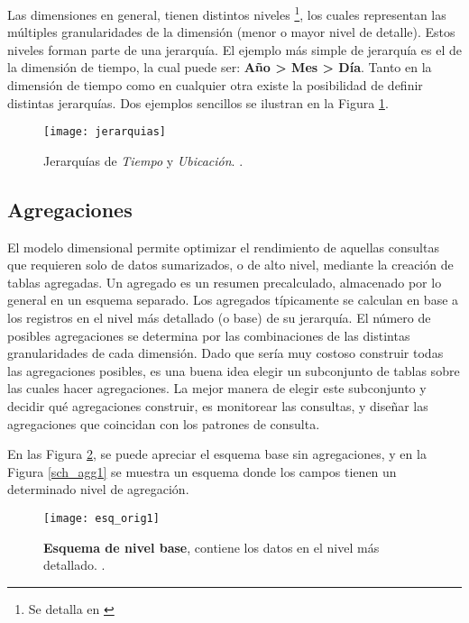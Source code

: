 \documentclass[a4paper,11pt]{article}
\begin{document}
    Las dimensiones en general, tienen distintos niveles \footnote{Se detalla en \cite[p.~94]{olap_solutions}}, los cuales representan las
    múltiples granularidades de la dimensión (menor o mayor nivel de detalle). Estos niveles forman parte de una jerarquía. El ejemplo más simple de
    jerarquía es el de la dimensión de tiempo, la cual puede ser: \textbf{Año > Mes > Día}. Tanto en la dimensión de
    tiempo como en cualquier otra existe la posibilidad de definir distintas jerarquías. Dos ejemplos sencillos se ilustran en la Figura
    \ref{jerarquías}.
    
    \begin{figure}
      \begin{center}
        \texttt{[image: jerarquias]}
        \caption{Jerarquías de \textit{Tiempo} y \textit{Ubicación}. \cite[p.~94]{olap_solutions}.}
        \label{jerarquías}
      \end{center}
    \end{figure}
    
    
    \subsection{Agregaciones} \label{agregaciones}
    
    El modelo dimensional permite optimizar el rendimiento de aquellas consultas que requieren solo de datos sumarizados, o de alto nivel,
    mediante la creación de tablas agregadas.
    Un agregado es un resumen precalculado, almacenado por lo general en un esquema separado. Los agregados típicamente se calculan en base
    a los registros en el nivel más detallado (o base) de su jerarquía.
    El número de posibles agregaciones se determina por las combinaciones de las distintas granularidades de cada dimensión.
    Dado que sería muy costoso construir todas las agregaciones  posibles, es una buena idea elegir un subconjunto de tablas sobre las cuales
    hacer agregaciones. La mejor manera de elegir este subconjunto y decidir qué  agregaciones construir, es monitorear las consultas, y diseñar
    las agregaciones que coincidan con los patrones de consulta.
    
    En las Figura \ref{sch_orig1}, se puede apreciar el esquema base sin agregaciones, y en la Figura \ref{sch_agg1} se muestra un esquema
    donde los campos tienen un determinado nivel de agregación.
    
    \begin{figure}
      \begin{center}
        \texttt{[image: esq\_orig1]}
        \caption{\textbf{Esquema de nivel base}, contiene los datos en el nivel más detallado. \cite[p.~172]{nagabhushana}.}
        \label{sch_orig1}
      \end{center}
    \end{figure}
    
\end{document}

